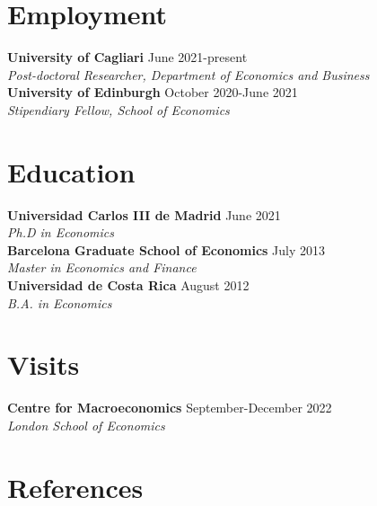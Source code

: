 \documentclass[margin]{res} %
\begin{document}
\begin{resume}

 
\section{Employment}
{\bf University of Cagliari} \hfill June 2021-present  \\
{\sl Post-doctoral Researcher, Department of Economics and Business} \\
{\bf University of Edinburgh} \hfill October 2020-June 2021  \\
{\sl Stipendiary Fellow, School of Economics} 


\section{Education}
{\bf Universidad Carlos III de Madrid} \hfill June 2021  \\
{\sl Ph.D in Economics} \\
{\bf Barcelona Graduate School of Economics} \hfill July 2013 \\
{\sl Master in Economics and Finance}  \\
{\bf Universidad de Costa Rica} \hfill August 2012 \\
{\sl B.A. in Economics}

\section{Visits}
{\bf Centre for Macroeconomics} \hfill September-December 2022  \\
{\sl London School of Economics}

\section{References}
\begin{multicols}{2}
	

\end{multicols}
\end{resume}
\end{document}

